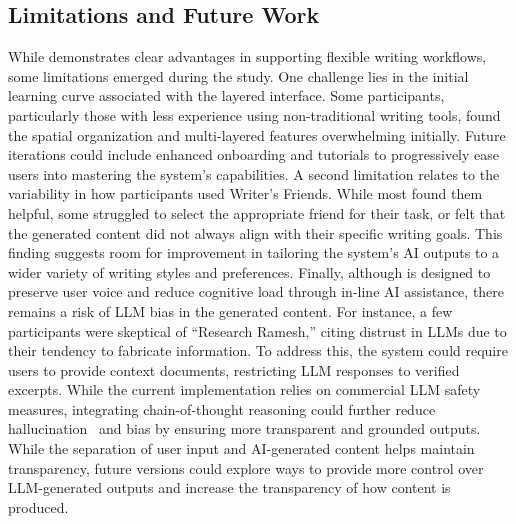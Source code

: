 \subsection{Limitations and Future Work}
While \system demonstrates clear advantages in supporting flexible writing workflows, some limitations emerged during the study. One challenge lies in the initial learning curve associated with the layered interface. Some participants, particularly those with less experience using non-traditional writing tools, found the spatial organization and multi-layered features overwhelming initially. Future iterations could include enhanced onboarding and tutorials to progressively ease users into mastering the system’s capabilities. A second limitation relates to the variability in how participants used Writer’s Friends. While most found them helpful, some struggled to select the appropriate friend for their task, or felt that the generated content did not always align with their specific writing goals. This finding suggests room for improvement in tailoring the system’s AI outputs to a wider variety of writing styles and preferences. Finally, although \system is designed to preserve user voice and reduce cognitive load through in-line AI assistance, there remains a risk of LLM bias in the generated content. For instance, a few participants were skeptical of ``Research Ramesh,'' citing distrust in LLMs due to their tendency to fabricate information. To address this, the system could require users to provide context documents, restricting LLM responses to verified excerpts. While the current implementation relies on commercial LLM safety measures, integrating chain-of-thought reasoning could further reduce hallucination~\cite{ji2024chain} and bias by ensuring more transparent and grounded outputs. While the separation of user input and AI-generated content helps maintain transparency, future versions could explore ways to provide more control over LLM-generated outputs and increase the transparency of how content is produced.




